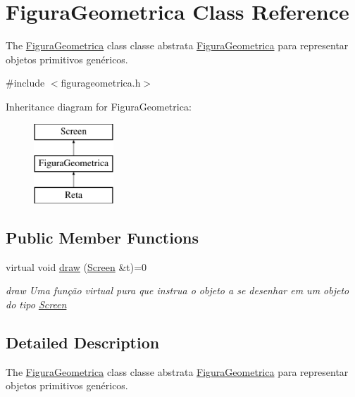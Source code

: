 \hypertarget{class_figura_geometrica}{}\section{Figura\+Geometrica Class Reference}
\label{class_figura_geometrica}


The \mbox{\hyperlink{class_figura_geometrica}{Figura\+Geometrica}} class classe abstrata \mbox{\hyperlink{class_figura_geometrica}{Figura\+Geometrica}} para representar objetos primitivos genéricos.  




{\ttfamily \#include $<$figurageometrica.\+h$>$}

Inheritance diagram for Figura\+Geometrica\+:\begin{figure}[H]
\begin{center}
\leavevmode
\includegraphics[height=3.000000cm]{class_figura_geometrica}
\end{center}
\end{figure}
\subsection*{Public Member Functions}
\begin{DoxyCompactItemize}
\item 
virtual void \mbox{\hyperlink{class_figura_geometrica_a8ee8dedc060b6059a805ea091aef2c41}{draw}} (\mbox{\hyperlink{class_screen}{Screen}} \&t)=0
\begin{DoxyCompactList}\small\item\em draw Uma função virtual pura que instrua o objeto a se desenhar em um objeto do tipo \mbox{\hyperlink{class_screen}{Screen}} \end{DoxyCompactList}\end{DoxyCompactItemize}


\subsection{Detailed Description}
The \mbox{\hyperlink{class_figura_geometrica}{Figura\+Geometrica}} class classe abstrata \mbox{\hyperlink{class_figura_geometrica}{Figura\+Geometrica}} para representar objetos primitivos genéricos. 

